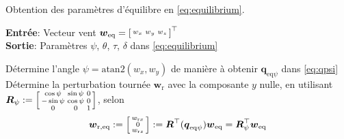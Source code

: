     \begin{algorithm}
    \caption{Obtention des paramètres d'équilibre en \eqref{eq:equilibrium}.}
    \label{alg:eq}
    \hspace*{.1cm} \textbf{Entrée}: Vecteur vent $\boldsymbol{w}_{\text{eq}} =\left[ \begin{smallmatrix}w_x & w_y & w_z \end{smallmatrix} \right]^\top$ \\
    \hspace*{.1cm} \textbf{Sortie}: Paramètres $\psi$, $\theta$, $\tau$, $\delta$ dans \eqref{eq:equilibrium}
    \begin{algorithmic}[1]
        \State Détermine l'angle $\psi = \text{atan2}(w_x, w_y)$ de manière à obtenir $\boldsymbol{q}_{\mathrm{eq}\psi}$ dans \eqref{eq:qpsi}  
        \State Détermine la perturbation tournée $\boldsymbol{w}_{\text{r}}$ avec la composante $y$ nulle, en utilisant $\boldsymbol{R}_{\psi}:= \left[ \begin{smallmatrix} \cos \psi & \sin \psi & 0 \\ -\sin \psi & \cos \psi & 0 \\ 0 & 0 & 1  \end{smallmatrix} \right]$, selon
        \begin{align}
        \label{eq:wh}
        \boldsymbol{w}_{\mathrm{r,eq}} := \left[ \begin{smallmatrix}w_{\text{r}x} \\ 0 \\w_{\text{r}z} \end{smallmatrix} \right] :=  \boldsymbol{R}^\top(\boldsymbol{q}_{\mathrm{eq}\psi}) \boldsymbol{w}_{\mathrm{eq}} = \boldsymbol{R}^\top_{\psi} \boldsymbol{w}_{\mathrm{eq}}
        \end{align}


\end{algorithmic}
\end{algorithm}

